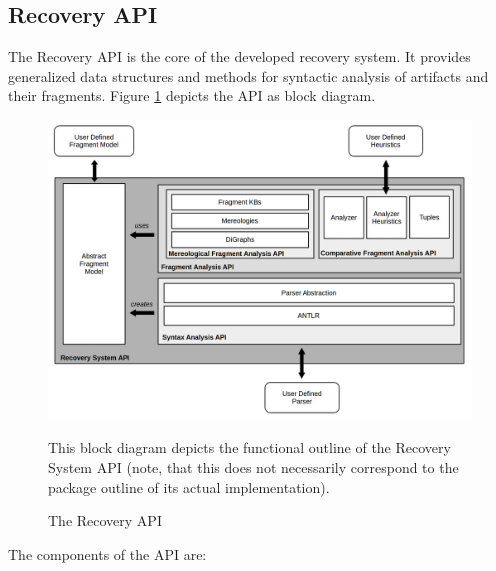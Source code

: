 \subsection{Recovery API}
\label{subsection:RecoveryAPI}
The Recovery \gls{API} is the core of the developed recovery system.
It provides generalized data structures and methods for syntactic analysis of artifacts and their fragments.
Figure \ref{figure:RecoverySystemAPI} depicts the \gls{API} as block diagram.
\begin{figure}[h!]
\begin{center}
\includegraphics[width=\textwidth]{images/RecoverySystemAPI.png}
\end{center}
{
\scriptsize
This block diagram depicts the functional outline of the Recovery System \gls{API} (note, that this does not necessarily correspond to the package outline of its actual implementation).
}
\caption{The Recovery API}
\label{figure:RecoverySystemAPI}
\end{figure}
The components of the \gls{API} are:
